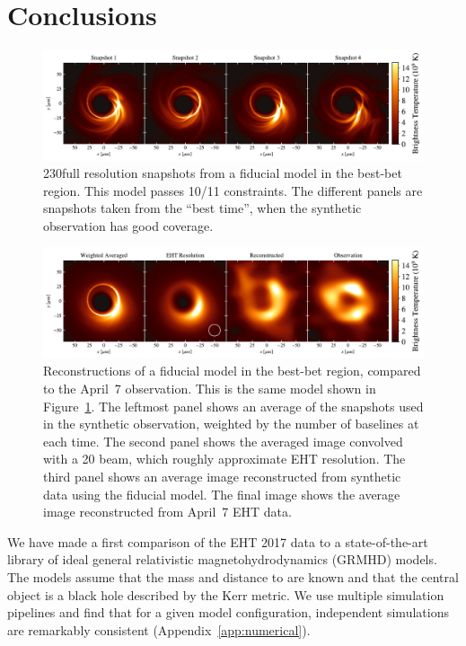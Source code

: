 \section{Conclusions}
\label{sec:conclusions}

\begin{figure}
  \centering
  \includegraphics[width=\textwidth]{figures/bestbet_imgs_frames.pdf}
  \caption{%
    230\GHz full resolution snapshots from a fiducial model in the
    best-bet region.
    This model passes 10/11 constraints.
    The different panels are snapshots taken from the ``best time'',
    when the synthetic observation has good \uv coverage.%
  }
  \label{fig:bestbet_imgs_snapshot}
\end{figure}

\begin{figure}
  \centering
  \includegraphics[width=\textwidth]{figures/bestbet_imgs_allframes.pdf}
  \caption{%
    Reconstructions of a fiducial model in the best-bet region,
    compared to the April~7 observation.
    This is the same model shown in
    Figure~\ref{fig:bestbet_imgs_snapshot}.
    The leftmost panel shows an average of the snapshots used in the
    synthetic observation, weighted by the number of baselines at
    each time.
    The second panel shows the averaged image convolved with a 20\uas
    beam, which roughly approximate EHT resolution.
    The third panel shows an average image reconstructed from
    synthetic data using the fiducial model.
    The final image shows the average image reconstructed from April~7
    EHT data.%
  }
  \label{fig:bestbet_imgs}
\end{figure}

We have made a first comparison of the EHT 2017 \sgra data to a state-of-the-art library of ideal general relativistic magnetohydrodynamics (GRMHD) models.
The models assume that the mass and distance to \sgra are known and that the central object is a black hole described by the Kerr metric.
We use multiple simulation pipelines and find that for a given model configuration, independent simulations are remarkably consistent (Appendix~\ref{app:numerical}).

